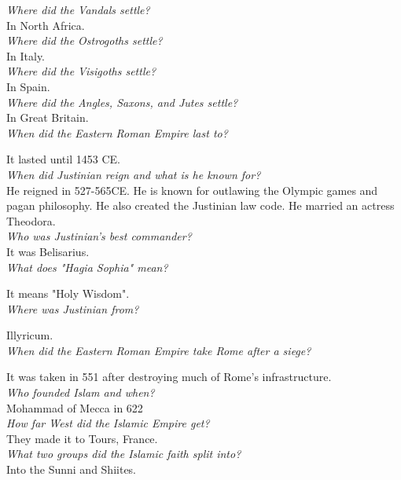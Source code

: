 \documentclass[12pt]{article}
\begin{document}
\textit{Where did the Vandals settle?}\\
In North Africa.\\

\textit{Where did the Ostrogoths settle?}\\
In Italy.\\

\textit{Where did the Visigoths settle?}\\
In Spain.\\

\textit{Where did the Angles, Saxons, and Jutes settle?}\\
In Great Britain.\\

\textit{When did the Eastern Roman Empire last to?}

It lasted until 1453 CE.\\

\textit{When did Justinian reign and what is he known for?}\\
He reigned in 527-565CE. He is known for outlawing the Olympic games and pagan philosophy. He also created the Justinian law code. He married an actress Theodora.\\

\textit{Who was Justinian's best commander?}\\
It was Belisarius.\\

\textit{What does "Hagia Sophia" mean?}

It means "Holy Wisdom".\\

\textit{Where was Justinian from?}

Illyricum.\\

\textit{When did the Eastern Roman Empire take Rome after a siege?}

It was taken in 551 after destroying much of Rome's infrastructure.\\

\textit{Who founded Islam and when?}\\
Mohammad of Mecca in 622\\

\textit{How far West did the Islamic Empire get?}\\
They made it to Tours, France.\\

\textit{What two groups did the Islamic faith split into?}\\
Into the Sunni and Shiites.\\
\end{document}
